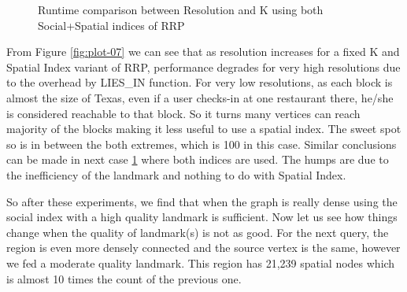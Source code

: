 \begin{figure*}[t!]
\begin{subfigure}[t]{0.5\textwidth}
		\caption{Runtime comparison between Resolution and K using both Social+Spatial indices of RRP}
		\label{fig:plot-08}
	\end{subfigure}
	\caption{Runtime comparison between Resolution and K for different types of RRP algorithms}
\end{figure*}

From Figure \ref{fig:plot-07} we can see that as resolution increases for a fixed K and Spatial Index variant of RRP, performance degrades for very high resolutions due to the overhead by LIES\_IN function. For very low resolutions, as each block is almost the size of Texas, even if a user checks-in at one restaurant there, he/she is considered reachable to that block. So it turns many vertices can reach majority of the blocks making it less useful to use a spatial index. The sweet spot so is in between the both extremes, which is 100 in this case. Similar conclusions can be made in next case \ref {fig:plot-08} where both indices are used. The humps are due to the inefficiency of the landmark and nothing to do with Spatial Index.

So after these experiments, we find that when the graph is really dense using the social index with a high quality landmark is sufficient. Now let us see how things change when the quality of landmark(s) is not as good. For the next query, the region is even more densely connected and the source vertex is the same, however we fed a moderate quality landmark. This region has 21,239 spatial nodes which is almost 10 times the count of the previous one.

